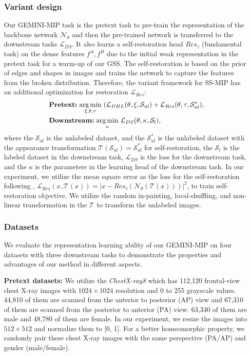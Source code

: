 \subsubsection{Variant design}
Our GEMINI-MIP task is the pretext task to pre-train the representation of the backbone network $\mathcal{N}_{\theta}$ and then the pre-trained network is transferred to the downstream tasks $\mathcal{L}_{DS}$. It also learns a self-restoration head $Res_{\tau}$ (fundamental task) on the dense features $f^{A},f^{B}$ due to the initial weak representation in the pretext task for a warm-up of our GSS. The self-restoration is based on the prior of edges and shapes in images and trains the network to capture the features from the broken distribution. Therefore, the variant framework for SS-MIP has an additional optimization for restoration $\mathcal{L}_{Res}$:
\begin{align}\label{equ:variant1}
&\textbf{\text{Pretext:}}\ \underset{\xi,\theta,\tau}{\arg\min}\ (\mathcal{L}_{DHL}(\theta,\xi,\mathcal{S}_{ul})+\mathcal{L}_{Res}(\theta,\tau,\mathcal{S}^{*}_{ul}),\notag\\
&\textbf{\text{Downstream:}}\ \underset{\kappa}{\arg\min}\ \mathcal{L}_{DS}(\theta,\kappa,\mathcal{S}_{l}),
\end{align}
where the $\mathcal{S}_{ul}$ is the unlabeled dataset, and the $\mathcal{S}^{*}_{ul}$ is the unlabeled dataset with the appearance transformation $\mathcal{T}(\mathcal{S}_{ul})=\mathcal{S}^{*}_{ul}$ for self-restoration, the $\mathcal{S}_{l}$ is the labeled dataset in the downstream task, $\mathcal{L}_{DS}$ is the loss for the downstream task, and the $\kappa$ is the parameters in the learning head of the downstream task. In our experiment, we utilize the mean square error as the loss for the self-restoration following \cite{zhou2019models}, $\mathcal{L}_{Res}(x,\mathcal{T}(x))=|x-Res_{\tau}(\mathcal{N}_{\theta}(\mathcal{T}(x)))|^{2}$, to train self-restoration objective. We utilize the random in-painting, local-shuffling, and non-linear transformation in the $\mathcal{T}$ to transform the unlabeled images.

\subsubsection{Datasets} We evaluate the representation learning ability of our GEMINI-MIP on four datasets with three downstream tasks to demonstrate the properties and advantages of our method in different aspects.

\textbf{Pretext datasets:} We utilize the \emph{ChestX-ray8} \cite{wang2017chestx} which has 112,120 frontal-view chest X-ray images with $1024\times1024$ resolution and 0 to 255 grayscale values. 44,810 of them are scanned from the anterior to posterior (AP) view and 67,310 of them are scanned from the posterior to anterior (PA) view. 63,340 of them are male and 48,780 of them are female. In our experiment, we resize the images into $512\times512$ and normalize them to [0, 1]. For a better homeomorphic property, we randomly pair these chest X-ray images with the same perspective (PA/AP) and gender (male/female).

